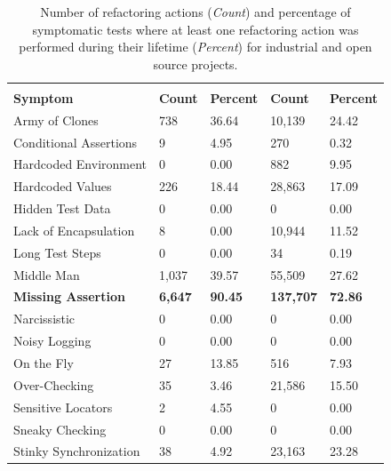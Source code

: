 \begin{table}
\centering

\caption{Number of refactoring actions (\emph{Count}) and percentage of symptomatic tests where at least one refactoring action was performed during their lifetime (\emph{Percent}) for industrial and open source projects.}
\label{tab:fixes}

\begin{tabular}{>{\raggedright}p{1.3in}>{\raggedleft}p{0.5in}>{\raggedleft}p{0.5in}>{\raggedleft}p{0.5in}>{\raggedleft}p{0.5in}}

\toprule
& \multicolumn{2}{c}{\scriptsize{\textbf{Industrial}}} & \multicolumn{2}{c}{\scriptsize{\textbf{Open Source}}} \tabularnewline
\scriptsize{\textbf{Symptom}} & \scriptsize{\textbf{Count}} & \scriptsize{\textbf{Percent}}  & \scriptsize{\textbf{Count}} & \scriptsize{\textbf{Percent}} \tabularnewline
\toprule
\scriptsize{Army of Clones} & \scriptsize{738} & \scriptsize{36.64} & \scriptsize{10,139} & \scriptsize{24.42} \tabularnewline
\scriptsize{Conditional Assertions} & \scriptsize{9} & \scriptsize{4.95} & \scriptsize{270} & \scriptsize{0.32} \tabularnewline
\scriptsize{Hardcoded Environment} & \scriptsize{0} & \scriptsize{0.00} & \scriptsize{882} & \scriptsize{9.95} \tabularnewline
\scriptsize{Hardcoded Values} & \scriptsize{226} & \scriptsize{18.44} & \scriptsize{28,863} & \scriptsize{17.09} \tabularnewline
\scriptsize{Hidden Test Data} & \scriptsize{0} & \scriptsize{0.00} & \scriptsize{0} & \scriptsize{0.00} \tabularnewline
\scriptsize{Lack of Encapsulation} & \scriptsize{8} & \scriptsize{0.00} & \scriptsize{10,944} & \scriptsize{11.52} \tabularnewline
\scriptsize{Long Test Steps} & \scriptsize{0} & \scriptsize{0.00} & \scriptsize{34} & \scriptsize{0.19} \tabularnewline
\scriptsize{Middle Man} & \scriptsize{1,037} & \scriptsize{39.57} & \scriptsize{55,509} & \scriptsize{27.62} \tabularnewline
\scriptsize{\textbf{Missing Assertion}} & \scriptsize{\textbf{6,647}} & \scriptsize{\textbf{90.45}} & \scriptsize{\textbf{137,707}} & \scriptsize{\textbf{72.86}} \tabularnewline
\scriptsize{Narcissistic} & \scriptsize{0} & \scriptsize{0.00} & \scriptsize{0} & \scriptsize{0.00} \tabularnewline
\scriptsize{Noisy Logging} & \scriptsize{0} & \scriptsize{0.00} & \scriptsize{0} & \scriptsize{0.00} \tabularnewline
\scriptsize{On the Fly} & \scriptsize{27} & \scriptsize{13.85} & \scriptsize{516} & \scriptsize{7.93} \tabularnewline
\scriptsize{Over-Checking} & \scriptsize{35} & \scriptsize{3.46} & \scriptsize{21,586} & \scriptsize{15.50} \tabularnewline
\scriptsize{Sensitive Locators} & \scriptsize{2} & \scriptsize{4.55} & \scriptsize{0} & \scriptsize{0.00} \tabularnewline
\scriptsize{Sneaky Checking} & \scriptsize{0} & \scriptsize{0.00} & \scriptsize{0} &\scriptsize{0.00} \tabularnewline
\scriptsize{Stinky Synchronization} & \scriptsize{38} & \scriptsize{4.92} & \scriptsize{23,163} & \scriptsize{23.28} \tabularnewline
\bottomrule
\end{tabular}

\end{table}

